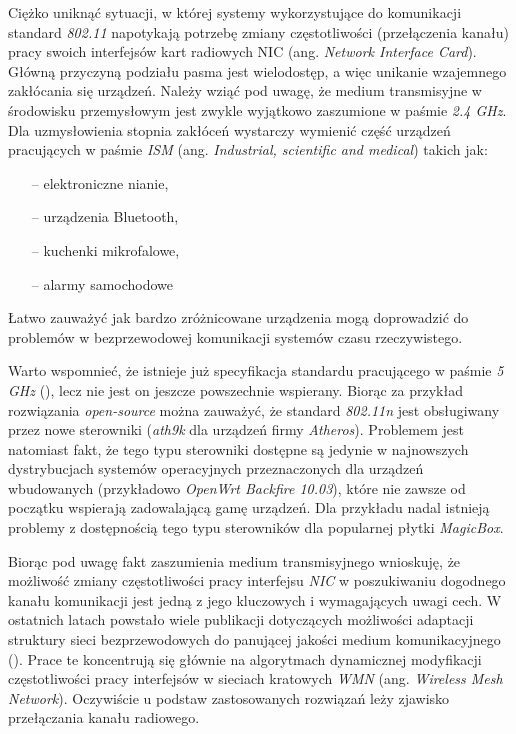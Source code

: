 %

Ciężko uniknąć sytuacji, w której systemy wykorzystujące do komunikacji standard \emph{802.11} napotykają potrzebę zmiany częstotliwości (przełączenia kanału) pracy swoich interfejsów kart radiowych NIC (ang. \emph{Network Interface Card}). Główną przyczyną podziału pasma jest wielodostęp, a więc unikanie wzajemnego zakłócania się urządzeń. Należy wziąć pod uwagę, że medium transmisyjne w środowisku przemysłowym jest zwykle wyjątkowo zaszumione w paśmie \emph{2.4 GHz}. Dla uzmysłowienia stopnia zakłóceń wystarczy wymienić część urządzeń pracujących w paśmie \emph{ISM} (ang. \emph{Industrial, scientific and medical}) takich jak:
\begin{itemize}
\item[--] elektroniczne nianie,
\item[--] urządzenia Bluetooth,
\item[--] kuchenki mikrofalowe,
\item[--] alarmy samochodowe
\end{itemize}
Łatwo zauważyć jak bardzo zróżnicowane urządzenia mogą doprowadzić do problemów w bezprzewodowej komunikacji systemów czasu rzeczywistego.

Warto wspomnieć, że istnieje już specyfikacja standardu pracującego w paśmie \emph{5 GHz} (\cite{std:IEEE80211n}), lecz nie jest on jeszcze powszechnie wspierany. Biorąc za przykład rozwiązania \emph{open-source} można zauważyć, że standard \emph{802.11n} jest obsługiwany przez nowe sterowniki (\emph{ath9k} dla urządzeń firmy \emph{Atheros}). Problemem jest natomiast fakt, że tego typu sterowniki dostępne są jedynie w najnowszych dystrybucjach systemów operacyjnych przeznaczonych dla urządzeń wbudowanych (przykładowo \emph{OpenWrt Backfire 10.03}), które nie zawsze od początku wspierają zadowalającą gamę urządzeń. Dla przykładu nadal istnieją problemy z dostępnością tego typu sterowników dla popularnej płytki \emph{MagicBox}.

Biorąc pod uwagę fakt zaszumienia medium transmisyjnego wnioskuję, że możliwość zmiany częstotliwości pracy interfejsu \emph{NIC} w poszukiwaniu dogodnego kanału komunikacji jest jedną z jego kluczowych i wymagających uwagi cech. W ostatnich latach powstało wiele publikacji dotyczących możliwości adaptacji struktury sieci bezprzewodowych do panującej jakości medium komunikacyjnego (\cite{pub:DCS}). Prace te koncentrują się głównie na algorytmach dynamicznej modyfikacji częstotliwości pracy interfejsów w sieciach kratowych \emph{WMN} (ang. \emph{Wireless Mesh Network}). Oczywiście u podstaw zastosowanych rozwiązań leży zjawisko przełączania kanału radiowego.

